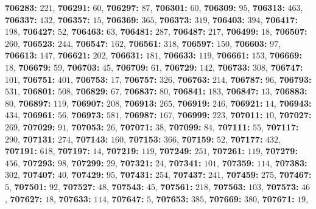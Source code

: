 \textsf{\bfseries 706283:} $221$, \textsf{\bfseries 706291:} $60$, \textsf{\bfseries 706297:} $87$, \textsf{\bfseries 706301:} $60$, \textsf{\bfseries 706309:} $95$, \textsf{\bfseries 706313:} $463$, \textsf{\bfseries 706337:} $132$, \textsf{\bfseries 706357:} $15$, \textsf{\bfseries 706369:} $365$, \textsf{\bfseries 706373:} $319$, \textsf{\bfseries 706403:} $394$, \textsf{\bfseries 706417:} $198$, \textsf{\bfseries 706427:} $52$, \textsf{\bfseries 706463:} $63$, \textsf{\bfseries 706481:} $287$, \textsf{\bfseries 706487:} $217$, \textsf{\bfseries 706499:} $18$, \textsf{\bfseries 706507:} $260$, \textsf{\bfseries 706523:} $244$, \textsf{\bfseries 706547:} $162$, \textsf{\bfseries 706561:} $318$, \textsf{\bfseries 706597:} $150$, \textsf{\bfseries 706603:} $97$, \textsf{\bfseries 706613:} $147$, \textsf{\bfseries 706621:} $202$, \textsf{\bfseries 706631:} $181$, \textsf{\bfseries 706633:} $119$, \textsf{\bfseries 706661:} $153$, \textsf{\bfseries 706669:} $18$, \textsf{\bfseries 706679:} $59$, \textsf{\bfseries 706703:} $45$, \textsf{\bfseries 706709:} $61$, \textsf{\bfseries 706729:} $142$, \textsf{\bfseries 706733:} $308$, \textsf{\bfseries 706747:} $101$, \textsf{\bfseries 706751:} $401$, \textsf{\bfseries 706753:} $17$, \textsf{\bfseries 706757:} $326$, \textsf{\bfseries 706763:} $214$, \textsf{\bfseries 706787:} $96$, \textsf{\bfseries 706793:} $531$, \textsf{\bfseries 706801:} $508$, \textsf{\bfseries 706829:} $67$, \textsf{\bfseries 706837:} $80$, \textsf{\bfseries 706841:} $183$, \textsf{\bfseries 706847:} $13$, \textsf{\bfseries 706883:} $80$, \textsf{\bfseries 706897:} $119$, \textsf{\bfseries 706907:} $208$, \textsf{\bfseries 706913:} $265$, \textsf{\bfseries 706919:} $246$, \textsf{\bfseries 706921:} $14$, \textsf{\bfseries 706943:} $434$, \textsf{\bfseries 706961:} $56$, \textsf{\bfseries 706973:} $581$, \textsf{\bfseries 706987:} $167$, \textsf{\bfseries 706999:} $223$, \textsf{\bfseries 707011:} $10$, \textsf{\bfseries 707027:} $269$, \textsf{\bfseries 707029:} $91$, \textsf{\bfseries 707053:} $26$, \textsf{\bfseries 707071:} $38$, \textsf{\bfseries 707099:} $84$, \textsf{\bfseries 707111:} $55$, \textsf{\bfseries 707117:} $290$, \textsf{\bfseries 707131:} $274$, \textsf{\bfseries 707143:} $160$, \textsf{\bfseries 707153:} $366$, \textsf{\bfseries 707159:} $52$, \textsf{\bfseries 707177:} $432$, \textsf{\bfseries 707191:} $618$, \textsf{\bfseries 707197:} $14$, \textsf{\bfseries 707219:} $119$, \textsf{\bfseries 707249:} $251$, \textsf{\bfseries 707261:} $119$, \textsf{\bfseries 707279:} $456$, \textsf{\bfseries 707293:} $98$, \textsf{\bfseries 707299:} $29$, \textsf{\bfseries 707321:} $24$, \textsf{\bfseries 707341:} $101$, \textsf{\bfseries 707359:} $114$, \textsf{\bfseries 707383:} $302$, \textsf{\bfseries 707407:} $40$, \textsf{\bfseries 707429:} $95$, \textsf{\bfseries 707431:} $254$, \textsf{\bfseries 707437:} $241$, \textsf{\bfseries 707459:} $275$, \textsf{\bfseries 707467:} $5$, \textsf{\bfseries 707501:} $92$, \textsf{\bfseries 707527:} $48$, \textsf{\bfseries 707543:} $45$, \textsf{\bfseries 707561:} $218$, \textsf{\bfseries 707563:} $103$, \textsf{\bfseries 707573:} $46$, \textsf{\bfseries 707627:} $18$, \textsf{\bfseries 707633:} $114$, \textsf{\bfseries 707647:} $5$, \textsf{\bfseries 707653:} $385$, \textsf{\bfseries 707669:} $380$, \textsf{\bfseries 707671:} $19$, 
